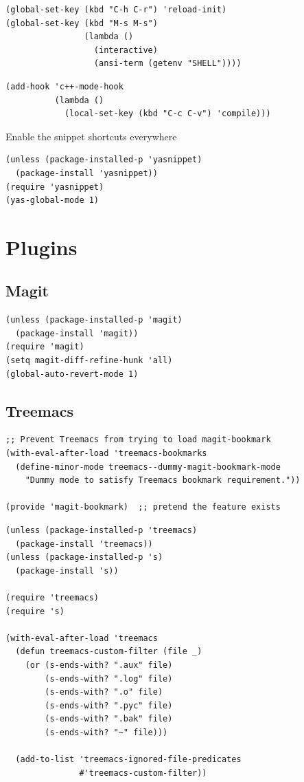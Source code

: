 \documentclass[11pt]{article}
\begin{document}
\begin{verbatim}
(global-set-key (kbd "C-h C-r") 'reload-init)
(global-set-key (kbd "M-s M-s")
                (lambda ()
                  (interactive)
                  (ansi-term (getenv "SHELL"))))
\end{verbatim}

\begin{verbatim}
(add-hook 'c++-mode-hook
          (lambda ()
            (local-set-key (kbd "C-c C-v") 'compile)))
\end{verbatim}


Enable the snippet shortcuts everywhere 
\begin{verbatim}
(unless (package-installed-p 'yasnippet)
  (package-install 'yasnippet))
(require 'yasnippet)
(yas-global-mode 1)
\end{verbatim}
\section{Plugins}
\label{sec:org5496b10}

\subsection{Magit}
\label{sec:orgc1f61f2}
\begin{verbatim}
(unless (package-installed-p 'magit)
  (package-install 'magit))
(require 'magit)
(setq magit-diff-refine-hunk 'all)
(global-auto-revert-mode 1)
\end{verbatim}
\subsection{Treemacs}
\label{sec:orge42b452}
\begin{verbatim}
;; Prevent Treemacs from trying to load magit-bookmark
(with-eval-after-load 'treemacs-bookmarks
  (define-minor-mode treemacs--dummy-magit-bookmark-mode
    "Dummy mode to satisfy Treemacs bookmark requirement."))

(provide 'magit-bookmark)  ;; pretend the feature exists
\end{verbatim}

\begin{verbatim}
(unless (package-installed-p 'treemacs)
  (package-install 'treemacs))
(unless (package-installed-p 's)
  (package-install 's))

(require 'treemacs)
(require 's)

(with-eval-after-load 'treemacs
  (defun treemacs-custom-filter (file _)
    (or (s-ends-with? ".aux" file)
        (s-ends-with? ".log" file)
        (s-ends-with? ".o" file)
        (s-ends-with? ".pyc" file)
        (s-ends-with? ".bak" file)
        (s-ends-with? "~" file)))

  (add-to-list 'treemacs-ignored-file-predicates
               #'treemacs-custom-filter))
\end{verbatim}
\end{document}
